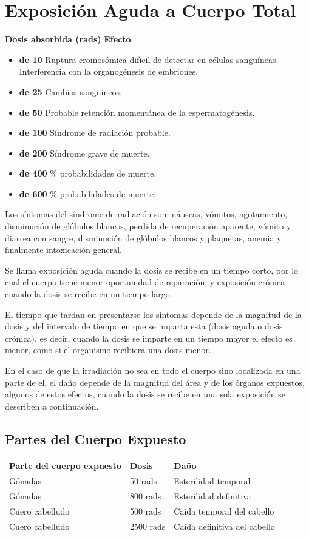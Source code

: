 \section*{Exposición Aguda a Cuerpo Total}

\textbf{Dosis absorbida (rads)} \quad \textbf{Efecto}
\begin{itemize}
    \item \textbf{de 10} \quad Ruptura cromosómica difícil de detectar en células sanguíneas. Interferencia con la organogénesis de embriones.
    \item \textbf{de 25} \quad Cambios sanguíneos.
    \item \textbf{de 50} \quad Probable retención momentánea de la espermatogénesis.
    \item \textbf{de 100} \quad Síndrome de radiación probable.
    \item \textbf{de 200} \quad Síndrome grave de muerte.
    \item \textbf{de 400} \% probabilidades de muerte.
    \item \textbf{de 600} \% probabilidades de muerte.
\end{itemize}

Los síntomas del síndrome de radiación son: náuseas, vómitos, agotamiento, disminución de glóbulos blancos, perdida de recuperación aparente, vómito y diarrea con sangre, disminución de glóbulos blancos y plaquetas, anemia y finalmente intoxicación general.

Se llama exposición aguda cuando la dosis se recibe en un tiempo corto, por lo cual el cuerpo tiene menor oportunidad de reparación, y exposición crónica cuando la dosis se recibe en un tiempo largo.

El tiempo que tardan en presentarse los síntomas depende de la magnitud de la dosis y del intervalo de tiempo en que se imparta esta (dosis aguda o dosis crónica), es decir, cuando la dosis se imparte en un tiempo mayor el efecto es menor, como si el organismo recibiera una dosis menor.

En el caso de que la irradiación no sea en todo el cuerpo sino localizada en una parte de el, el daño depende de la magnitud del área y de los órganos expuestos, algunos de estos efectos, cuando la dosis se recibe en una sola exposición se describen a continuación.

\subsection*{Partes del Cuerpo Expuesto}
\begin{tabular}{lll}
\textbf{Parte del cuerpo expuesto} & \textbf{Dosis} & \textbf{Daño} \\
Gónadas & 50 rads & Esterilidad temporal\\
Gónadas & 800 rads & Esterilidad definitiva\\
Cuero cabelludo & 500 rads & Caída temporal del cabello\\
Cuero cabelludo & 2500 rads & Caída definitiva del cabello\\
\end{tabular}